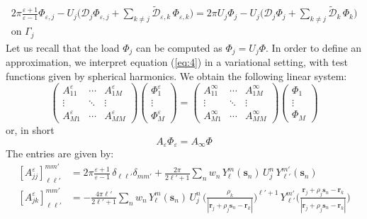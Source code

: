 \documentclass[12pt,letterpaper,oneside]{article}
\theoremstyle{definition}
\begin{document}
\begin{multline}\label{eq:4}
2\pi \frac{\varepsilon + 1}{\varepsilon - 1}\Phi_{\varepsilon,j} - U_j \bigg( {\mathcal{D}}_j \Phi_{\varepsilon,j} + \sum_{k \ne j} \tilde{\mathcal{D}}_{\varepsilon,k} \, \Phi_{\varepsilon,k}  \bigg) = 2 \pi U_j \Phi_j - U_j \bigg( {\mathcal{D}}_j \Phi_{j} + \sum_{k \ne j} \tilde{\mathcal{D}}_{k} \, \Phi_{k}  \bigg) \\ \text{on }\Gamma_j
\end{multline}
Let us recall that the load $\Phi_j$ can be computed as $\Phi_j = U_j \Phi$. In order to define an approximation, we interpret equation (\ref{eq:4}) in a variational setting, with test functions given by spherical harmonics. We obtain the following linear system:
\[
\begin{pmatrix}
A_{11}^\varepsilon	& \cdots 	& A_{1M}^\varepsilon  \\
\vdots 			& \ddots 	& \vdots \\
A_{M1}^\varepsilon 	& \cdots 	& A_{MM}^\varepsilon
\end{pmatrix}
\begin{pmatrix}
\Phi_1^\varepsilon \\ \vdots \\ \Phi_M^\varepsilon
\end{pmatrix}
=
\begin{pmatrix}
A_{11}^\infty	& \cdots 	& A_{1M}^\infty  \\
\vdots 		& \ddots 	& \vdots \\
A_{M1}^\infty 	& \cdots 	& A_{MM}^\infty
\end{pmatrix}
\begin{pmatrix}
\Phi_1 \\ \vdots \\ \Phi_M
\end{pmatrix}
\]
or, in short
\[
A_\varepsilon \Phi_\varepsilon = A_\infty \Phi
\]
The entries are given by:
\begin{align*}
{[A_{jj}^\varepsilon]}_{\ell \ell'}^{mm'}& = 2\pi \frac{\varepsilon + 1}{\varepsilon - 1}\, \delta_{\ell \ell'} \delta_{m m'} + \frac{2\pi}{2 \ell' + 1} \sum_n w_n \,Y_\ell^m(\boldsymbol{s}_n) \, U_j^n \, Y_{\ell'}^{m'}(\boldsymbol{s}_n) \\
{[A_{jk}^\varepsilon]}_{\ell \ell'}^{mm'}& = -  \frac{4 \pi \ell'}{2 \ell'+1} \sum_n w_n \, Y_\ell^m(\boldsymbol{s}_n) \, U_j^n \, \bigg( \frac{\rho_k}{|\boldsymbol{r}_j + \rho_j \boldsymbol{s}_n - \boldsymbol{r}_k|} \bigg)^{\ell'+1} \, Y_{\ell'}^{m'} \bigg( \frac{\boldsymbol{r}_j + \rho_j \boldsymbol{s}_n - \boldsymbol{r}_k}{|\boldsymbol{r}_j + \rho_j \boldsymbol{s}_n - \boldsymbol{r}_k|} \bigg)
\end{align*}
\end{document}
